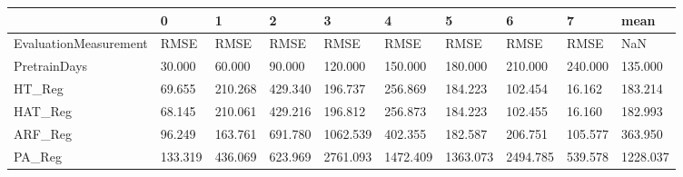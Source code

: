 \begin{tabular}{llllllllll}
\toprule
{} &       0 &       1 &       2 &        3 &        4 &        5 &        6 &       7 &     mean \\
\midrule
EvaluationMeasurement &    RMSE &    RMSE &    RMSE &     RMSE &     RMSE &     RMSE &     RMSE &    RMSE &      NaN \\
PretrainDays          &  30.000 &  60.000 &  90.000 &  120.000 &  150.000 &  180.000 &  210.000 & 240.000 &  135.000 \\
HT\_Reg                &  69.655 & 210.268 & 429.340 &  196.737 &  256.869 &  184.223 &  102.454 &  16.162 &  183.214 \\
HAT\_Reg               &  68.145 & 210.061 & 429.216 &  196.812 &  256.873 &  184.223 &  102.455 &  16.160 &  182.993 \\
ARF\_Reg               &  96.249 & 163.761 & 691.780 & 1062.539 &  402.355 &  182.587 &  206.751 & 105.577 &  363.950 \\
PA\_Reg                & 133.319 & 436.069 & 623.969 & 2761.093 & 1472.409 & 1363.073 & 2494.785 & 539.578 & 1228.037 \\
\bottomrule
\end{tabular}
